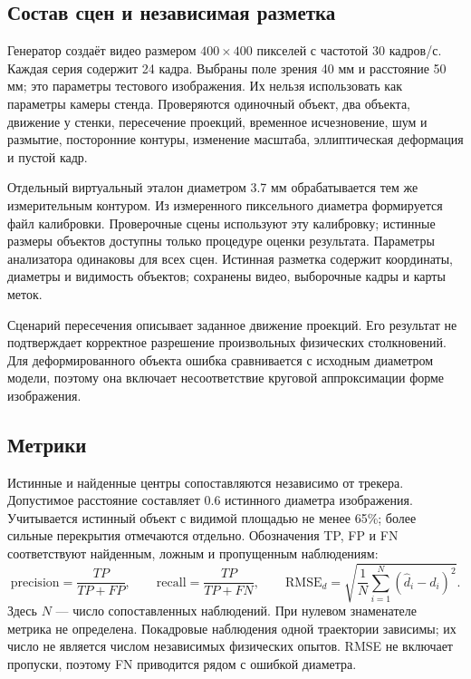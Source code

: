 \documentclass[12pt,a4paper]{article}
\begin{document}
\subsection{Состав сцен и независимая разметка}
Генератор создаёт видео размером $400\times400$ пикселей с частотой 30 кадров/с. Каждая серия содержит 24 кадра. Выбраны поле зрения 40 мм и расстояние 50 мм; это параметры тестового изображения. Их нельзя использовать как параметры камеры стенда. Проверяются одиночный объект, два объекта, движение у стенки, пересечение проекций, временное исчезновение, шум и размытие, посторонние контуры, изменение масштаба, эллиптическая деформация и пустой кадр.

Отдельный виртуальный эталон диаметром 3.7 мм обрабатывается тем же измерительным контуром. Из измеренного пиксельного диаметра формируется файл калибровки. Проверочные сцены используют эту калибровку; истинные размеры объектов доступны только процедуре оценки результата. Параметры анализатора одинаковы для всех сцен. Истинная разметка содержит координаты, диаметры и видимость объектов; сохранены видео, выборочные кадры и карты меток.

Сценарий пересечения описывает заданное движение проекций. Его результат не подтверждает корректное разрешение произвольных физических столкновений. Для деформированного объекта ошибка сравнивается с исходным диаметром модели, поэтому она включает несоответствие круговой аппроксимации форме изображения.

\subsection{Метрики}
Истинные и найденные центры сопоставляются независимо от трекера. Допустимое расстояние составляет 0.6 истинного диаметра изображения. Учитывается истинный объект с видимой площадью не менее 65\%; более сильные перекрытия отмечаются отдельно. Обозначения TP, FP и FN соответствуют найденным, ложным и пропущенным наблюдениям:
\[
\mathrm{precision}=\frac{TP}{TP+FP},\qquad
\mathrm{recall}=\frac{TP}{TP+FN},\qquad
\mathrm{RMSE}_d=\sqrt{\frac1{N}\sum_{i=1}^{N}(\widehat d_i-d_i)^2}.
\]
Здесь $N$ --- число сопоставленных наблюдений. При нулевом знаменателе метрика не определена. Покадровые наблюдения одной траектории зависимы; их число не является числом независимых физических опытов. RMSE не включает пропуски, поэтому FN приводится рядом с ошибкой диаметра.
\end{document}
